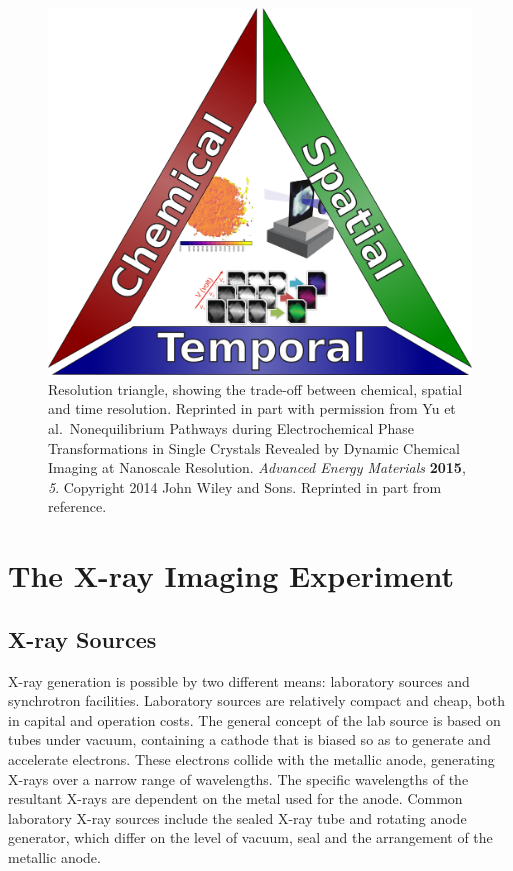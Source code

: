 \documentclass[journal=cmatex,manuscript=perspective]{achemso}
\begin{document}
\begin{figure}
  \includegraphics[width=\textwidth]{resolution-triangle.png}
  \caption{Resolution triangle, showing the trade-off between
    chemical, spatial and time resolution. Reprinted in part with
    permission from Yu et al.\ Nonequilibrium Pathways during
    Electrochemical Phase Transformations in Single Crystals Revealed
    by Dynamic Chemical Imaging at Nanoscale
    Resolution. \textit{Advanced Energy Materials} \textbf{2015},
    \textit{5}. Copyright 2014 John Wiley and Sons. Reprinted in part
    from reference\cite{shapiro2014}.}
  \label{figure:resolution-triangle}
\end{figure}

\section{The X-ray Imaging Experiment}

\subsection{X-ray Sources}

X-ray generation is possible by two different means: laboratory
sources and synchrotron facilities. Laboratory sources are relatively
compact and cheap, both in capital and operation costs. The general
concept of the lab source is based on tubes under vacuum, containing a
cathode that is biased so as to generate and accelerate
electrons. These electrons collide with the metallic anode, generating
X-rays over a narrow range of wavelengths. The specific wavelengths of
the resultant X-rays are dependent on the metal used for the
anode. Common laboratory X-ray sources include the sealed X-ray tube
and rotating anode generator, which differ on the level of vacuum,
seal and the arrangement of the metallic anode\cite{guinebretiere}.
\end{document}
